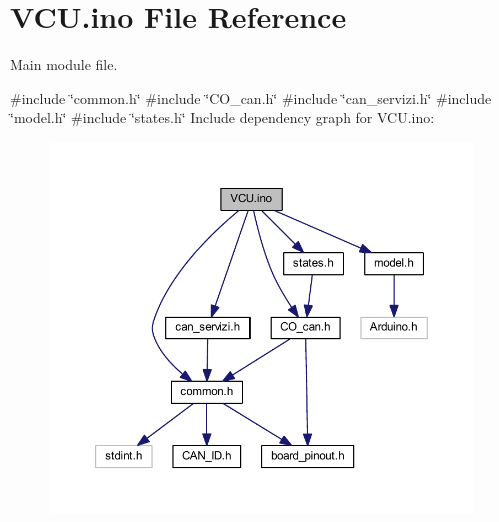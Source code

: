 \hypertarget{_v_c_u_8ino}{}\section{V\+C\+U.\+ino File Reference}
\label{_v_c_u_8ino}


Main module file.  


{\ttfamily \#include \char`\"{}common.\+h\char`\"{}}\newline
{\ttfamily \#include \char`\"{}C\+O\+\_\+can.\+h\char`\"{}}\newline
{\ttfamily \#include \char`\"{}can\+\_\+servizi.\+h\char`\"{}}\newline
{\ttfamily \#include \char`\"{}model.\+h\char`\"{}}\newline
{\ttfamily \#include \char`\"{}states.\+h\char`\"{}}\newline
Include dependency graph for V\+C\+U.\+ino\+:\nopagebreak
\begin{figure}[H]
\begin{center}
\leavevmode
\includegraphics[width=350pt]{_v_c_u_8ino__incl}
\end{center}
\end{figure}
